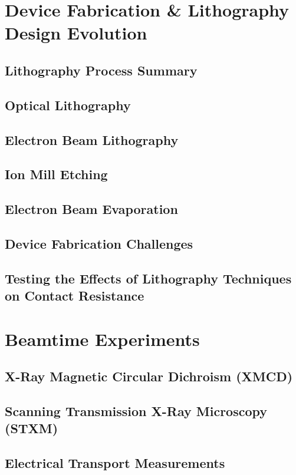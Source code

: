 \section{Device Fabrication \& Lithography Design Evolution}\label{sec:DevFab&LithDesignEvo}
\subsection{Lithography Process Summary}\label{subsec:LithProcessSummary}

\subsection{Optical Lithography}\label{subsec:OptLith}

\subsection{Electron Beam Lithography}\label{subsec:EBeamLith}

\subsection{Ion Mill Etching}\label{subsec:Milling}

\subsection{Electron Beam Evaporation}\label{subsec:EBeamEvap}

\subsection{Device Fabrication Challenges}\label{subsec:DevFabChallenges}

\subsection{Testing the Effects of Lithography Techniques on Contact Resistance}\label{subsec:LithEffects&ContactRes}

\section{Beamtime Experiments}\label{sec:Beamtimes}
\subsection{X-Ray Magnetic Circular Dichroism (XMCD)}\label{subsec:XMCD}

\subsection{Scanning Transmission X-Ray Microscopy (STXM)}\label{subsec:STXM}

\subsection{Electrical Transport Measurements}\label{subsec:ElecTransport}

